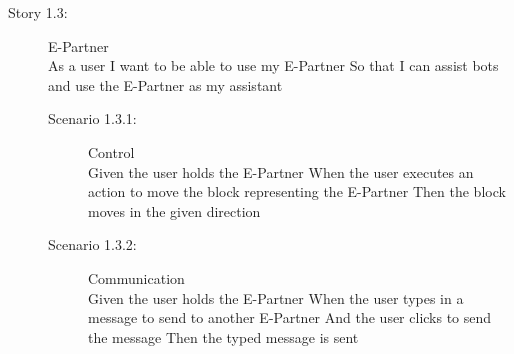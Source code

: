\begin{description}
	\item[Story 1.3:] E-Partner\\
	As a user
	I want to be able to use my E-Partner
	So that I can assist bots and use the E-Partner as my assistant

	\begin{description}
		\item[Scenario 1.3.1:] Control\\
		Given the user holds the E-Partner
		When the user executes an action to move the block representing the E-Partner
		Then the block moves in the given direction
		
		\item[Scenario 1.3.2:] Communication\\
		Given the user holds the E-Partner
		When the user types in a message to send to another E-Partner
		And the user clicks to send the message
		Then the typed message is sent
	\end{description}
\end{description}

